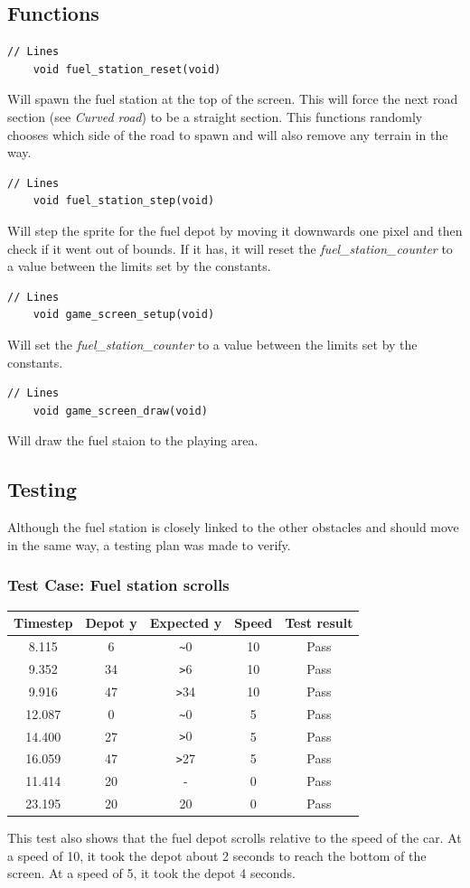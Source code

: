 \documentclass{article}
\begin{document}
\subsection*{Functions}
\begin{lstlisting}[style=CStyle]
	// Lines 
	void fuel_station_reset(void)
\end{lstlisting}
Will spawn the fuel station at the top of the screen. This will force the next road section (see \emph{Curved road}) to be a straight section. This functions randomly chooses which side of the road to spawn and will also remove any terrain in the way.
\begin{lstlisting}[style=CStyle]
	// Lines 
	void fuel_station_step(void)
\end{lstlisting}
Will step the sprite for the fuel depot by moving it downwards one pixel and then check if it went out of bounds. If it has, it will reset the \emph{fuel\_station\_counter} to a value between the limits set by the constants.
\begin{lstlisting}[style=CStyle]
	// Lines 
	void game_screen_setup(void)
\end{lstlisting}
Will set the \emph{fuel\_station\_counter} to a value between the limits set by the constants. 
\begin{lstlisting}[style=CStyle]
	// Lines 
	void game_screen_draw(void)
\end{lstlisting}
Will draw the fuel staion to the playing area. 
\newpage

\subsection*{Testing}
Although the fuel station is closely linked to the other obstacles and should move in the same way, a testing plan was made to verify. 
\subsubsection*{Test Case: Fuel station scrolls}
\begin{center}
\begin{tabular}{ c c c c c }
Timestep	& Depot y	& Expected y 	& Speed	& Test result		\\ \hline
8.115		& 6		& \verb|~|0		& 10		& Pass		\\
9.352		& 34		& \verb|>|6		& 10		& Pass		\\
9.916		& 47		& \verb|>|34	& 10		& Pass		\\
12.087	& 0		& \verb|~|0		& 5		& Pass		\\
14.400	& 27		& \verb|>|0		& 5		& Pass		\\
16.059	& 47		& \verb|>|27	& 5		& Pass		\\
11.414	& 20		& - 			& 0		& Pass		\\
23.195	& 20		& 20			& 0		& Pass		\\ \hline
\end{tabular}
\end{center}
This test also shows that the fuel depot scrolls relative to the speed of the car. At a speed of 10, it took the depot about 2 seconds to reach the bottom of the screen. At a speed of 5, it took the depot 4 seconds.
\clearpage
\end{document}

